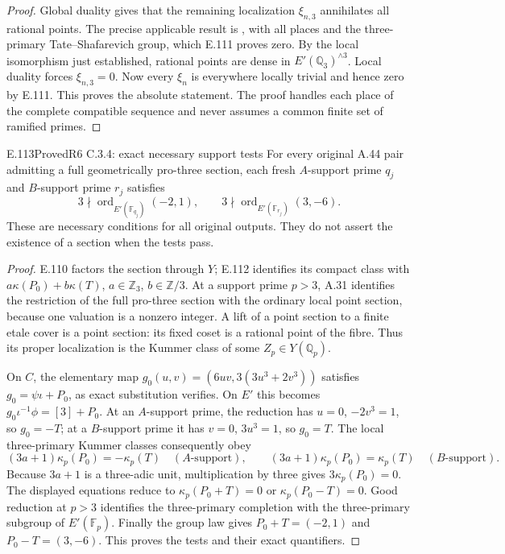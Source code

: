 \begin{proof}
Global duality gives that the remaining localization $\xi_{n,3}$
annihilates all rational points. The precise applicable result is
\citet[I.6.26(b), p.~92]{CohMilneADT}, with all places and the
three-primary Tate--Shafarevich group, which E.111 proves zero.
By the local isomorphism just established, rational points are dense
in $E'(\mathbb Q_3)^{\wedge3}$. Local duality
\citep[I.3.3--3.5]{CohMilneADT} forces $\xi_{n,3}=0$.
Now every $\xi_n$ is everywhere locally trivial and hence zero by
E.111. This proves the absolute statement. The proof handles each
place of the complete compatible sequence and never assumes a
common finite set of ramified primes.
\end{proof}

\begin{result}{E.113}{Proved}{R6 C.3.4: exact necessary support tests}
For every original A.44 pair admitting a full geometrically
pro-three section, each fresh $A$-support prime $q_j$ and
$B$-support prime $r_j$ satisfies
\[
 3\nmid\operatorname{ord}_{E'(\mathbb F_{q_j})}(-2,1),\qquad
 3\nmid\operatorname{ord}_{E'(\mathbb F_{r_j})}(3,-6).
\]
These are necessary conditions for all original outputs. They do
not assert the existence of a section when the tests pass.
\end{result}
\begin{proof}
E.110 factors the section through $Y$; E.112 identifies its compact
class with $a\kappa(P_0)+b\kappa(T)$, $a\in\mathbb Z_3$,
$b\in\mathbb Z/3$. At a support prime $p>3$, A.31 identifies the
restriction of the full pro-three section with the ordinary local
point section, because one valuation is a nonzero integer.
A lift of a point section to a finite etale cover is a point section:
its fixed coset is a rational point of the fibre. Thus its proper
localization is the Kummer class of some $Z_p\in Y(\mathbb Q_p)$.

On $C$, the elementary map
$g_0(u,v)=(6uv,3(3u^3+2v^3))$ satisfies
$g_0=\psi\iota+P_0$, as exact substitution verifies. On $E'$ this
becomes $g_0\iota^{-1}\phi=[3]+P_0$. At an $A$-support prime,
the reduction has $u=0$, $-2v^3=1$, so $g_0=-T$; at a
$B$-support prime it has $v=0$, $3u^3=1$, so $g_0=T$.
The local three-primary Kummer classes consequently obey
\[
 (3a+1)\kappa_p(P_0)=-\kappa_p(T)\quad(A\text{-support}),\qquad
 (3a+1)\kappa_p(P_0)=\kappa_p(T)\quad(B\text{-support}).
\]
Because $3a+1$ is a three-adic unit, multiplication by three gives
$3\kappa_p(P_0)=0$. The displayed equations reduce to
$\kappa_p(P_0+T)=0$ or $\kappa_p(P_0-T)=0$.
Good reduction at $p>3$ identifies the three-primary completion
with the three-primary subgroup of $E'(\mathbb F_p)$.
Finally the group law gives $P_0+T=(-2,1)$ and $P_0-T=(3,-6)$.
This proves the tests and their exact quantifiers.
\end{proof}

